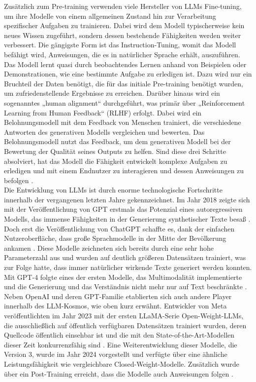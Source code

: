 Zusätzlich zum Pre-training verwenden viele Hersteller von LLMs Fine-tuning, um ihre Modelle von einem allgemeinen Zustand hin zur Verarbeitung spezifischer Aufgaben zu trainieren. Dabei wird dem Modell typischerweise kein neues Wissen zugeführt, sondern dessen bestehende Fähigkeiten werden weiter verbessert. Die gängigste Form ist das Instruction-Tuning, womit das Modell befähigt wird, Anweisungen, die es in natürlicher Sprache erhält, auszuführen. Das Modell lernt quasi durch beobachtendes Lernen anhand von Beispielen oder Demonstrationen, wie eine bestimmte Aufgabe zu erledigen ist. Dazu wird nur ein Bruchteil der Daten benötigt, die für das initiale Pre-training benötigt wurden, um zufriedenstellende Ergebnisse zu erreichen.
Darüber hinaus wird ein sogenanntes „human alignment“ durchgeführt, was primär über „Reinforcement Learning from Human Feedback“ (RLHF) erfolgt. Dabei wird ein Belohnungsmodell mit dem Feedback von Menschen trainiert, die verschiedene Antworten des generativen Modells vergleichen und bewerten. Das Belohnungsmodell nutzt das Feedback, um dem generativen Modell bei der Bewertung der Qualität seines Outputs zu helfen.
Sind diese drei Schritte absolviert, hat das Modell die Fähigkeit entwickelt komplexe Aufgaben zu erledigen und mit einem Endnutzer zu interagieren und dessen Anweisungen zu befolgen \autocite{Zhao_Zhou_Li_Tang_Wen_2026}. \\
Die Entwicklung von LLMs ist durch enorme technologische Fortschritte innerhalb der vergangenen letzten Jahre gekennzeichnet. Im Jahr 2018 zeigte sich mit der Veröffentlichung von GPT erstmals das Potenzial eines autoregressiven Modells, das immense Fähigkeiten in der Generierung synthetischer Texte besaß \autocite{kehkashan2025}. Doch erst die Veröffentlichung von ChatGPT schaffte es, dank der einfachen Nutzeroberfläche, dass große Sprachmodelle in der Mitte der Bevölkerung ankamen \autocite{openai2022}. Diese Modelle zeichneten sich bereits durch eine sehr hohe Parameterzahl aus und wurden auf deutlich größeren Datensätzen trainiert, was zur Folge hatte, dass immer natürlicher wirkende Texte generiert werden konnten. Mit GPT-4 folgte eines der ersten Modelle, das Multimodalität implementierte und die Generierung und das Verständnis nicht mehr nur auf Text beschränkte \autocite{Proehl_Mohrhardt_Foerster_Putzier_Zarnekow_2024}. Neben OpenAI und deren GPT-Familie etablierten sich auch andere Player innerhalb des LLM-Kosmos, wie oben kurz erwähnt. Entwickler von Meta veröffentlichten im Jahr 2023 mit der ersten LLaMA-Serie Open-Weight-LLMs, die ausschließlich auf öffentlich verfügbaren Datensätzen trainiert wurden, deren Quellcode öffentlich einsehbar ist und die mit den State-of-the-Art-Modellen dieser Zeit konkurrenzfähig sind \autocite{touvron2023llamaopenefficientfoundation}. Eine Weiterentwicklung dieser Modelle, die Version 3, wurde im Jahr 2024 vorgestellt und verfügte über eine ähnliche Leistungsfähigkeit wie vergleichbare Closed-Weight-Modelle. Zusätzlich wurde über ein Post-Training erreicht, dass die Modelle auch Anweisungen folgen \autocite{grattafiori2024llama3herdmodels}.
